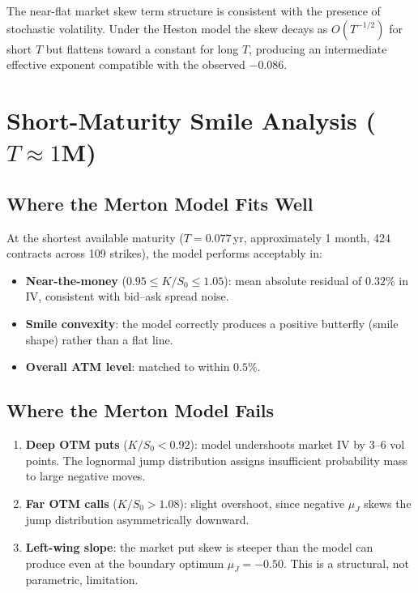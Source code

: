 \documentclass[12pt, a4paper]{article}
\begin{document}
The near-flat market skew term structure is consistent with the presence of
stochastic volatility. Under the Heston model the skew decays as $O(T^{-1/2})$
for short $T$ but flattens toward a constant for long $T$, producing an
intermediate effective exponent compatible with the observed $-0.086$.

\section{Short-Maturity Smile Analysis ($T \approx 1$M)}

\subsection{Where the Merton Model Fits Well}

At the shortest available maturity ($T = 0.077$\,yr, approximately 1 month,
424 contracts across 109 strikes), the model performs acceptably in:

\begin{itemize}
    \item \textbf{Near-the-money} ($0.95 \leq K/S_0 \leq 1.05$): mean absolute
    residual of $0.32\%$ in IV, consistent with bid--ask spread noise.
    \item \textbf{Smile convexity}: the model correctly produces a positive
    butterfly (smile shape) rather than a flat line.
    \item \textbf{Overall ATM level}: matched to within $0.5\%$.
\end{itemize}

\subsection{Where the Merton Model Fails}

\begin{enumerate}
    \item \textbf{Deep OTM puts} ($K/S_0 < 0.92$): model undershoots market IV
    by 3--6 vol points. The lognormal jump distribution assigns insufficient
    probability mass to large negative moves.

    \item \textbf{Far OTM calls} ($K/S_0 > 1.08$): slight overshoot, since
    negative $\mu_J$ skews the jump distribution asymmetrically downward.

    \item \textbf{Left-wing slope}: the market put skew is steeper than the
    model can produce even at the boundary optimum $\mu_J = -0.50$. This is a
    structural, not parametric, limitation.
\end{enumerate}
\end{document}
